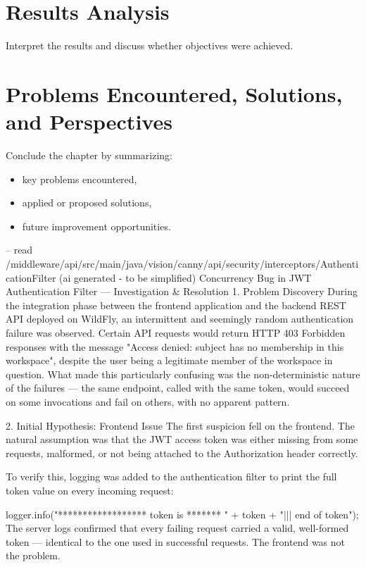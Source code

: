 \section{Results Analysis}
Interpret the results and discuss whether objectives were achieved.

\section{Problems Encountered, Solutions, and Perspectives}
Conclude the chapter by summarizing:
\begin{itemize}
    \item key problems encountered,
    \item applied or proposed solutions,
    \item future improvement opportunities.
\end{itemize}





-- read /middleware/api/src/main/java/vision/canny/api/security/interceptors/AuthenticationFilter
(ai generated - to be simplified)
Concurrency Bug in JWT Authentication Filter — Investigation & Resolution
1. Problem Discovery
During the integration phase between the frontend application and the backend REST API deployed on WildFly, an intermittent and seemingly random authentication failure was observed. Certain API requests would return HTTP 403 Forbidden responses with the message "Access denied: subject has no membership in this workspace", despite the user being a legitimate member of the workspace in question. What made this particularly confusing was the non-deterministic nature of the failures — the same endpoint, called with the same token, would succeed on some invocations and fail on others, with no apparent pattern.

2. Initial Hypothesis: Frontend Issue
The first suspicion fell on the frontend. The natural assumption was that the JWT access token was either missing from some requests, malformed, or not being attached to the Authorization header correctly.

To verify this, logging was added to the authentication filter to print the full token value on every incoming request:


logger.info("****************** token is *******  " + token + "||| end of token");
The server logs confirmed that every failing request carried a valid, well-formed token — identical to the one used in successful requests. The frontend was not the problem.

